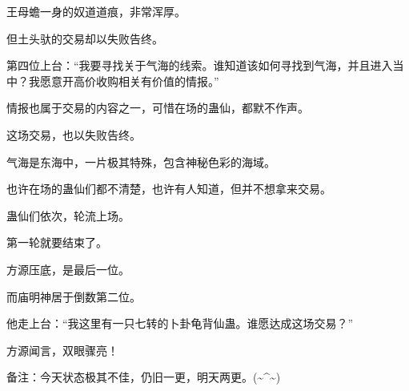 \begin{this_body}
王母蟾一身的奴道道痕，非常浑厚。

但土头驮的交易却以失败告终。

第四位上台：“我要寻找关于气海的线索。谁知道该如何寻找到气海，并且进入当中？我愿意开高价收购相关有价值的情报。”

情报也属于交易的内容之一，可惜在场的蛊仙，都默不作声。

这场交易，也以失败告终。

气海是东海中，一片极其特殊，包含神秘色彩的海域。

也许在场的蛊仙们都不清楚，也许有人知道，但并不想拿来交易。

蛊仙们依次，轮流上场。

第一轮就要结束了。

方源压底，是最后一位。

而庙明神居于倒数第二位。

他走上台：“我这里有一只七转的卜卦龟背仙蛊。谁愿达成这场交易？”

方源闻言，双眼骤亮！

备注：今天状态极其不佳，仍旧一更，明天两更。(\~{}\^{}\~{})

\end{this_body}

